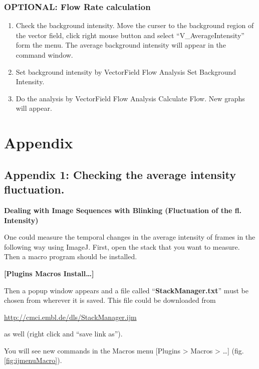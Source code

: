 \documentclass{article}
\begin{document}
\subsubsection{OPTIONAL: Flow Rate calculation}
\begin{enumerate}
\item
  Check the background intensity. Move the curser to the background
  region of the vector field, click right mouse button and select
  ``V\_AverageIntensity'' form the menu. The average background
  intensity will appear in the command window.
\item
  Set background intensity by VectorField Flow Analysis Set Background
  Intensity.
\item
  Do the analysis by VectorField Flow Analysis Calculate Flow. New
  graphs will appear.
\end{enumerate}

\section{Appendix}
\label{appendix}

\label{subsec:app1}
\subsection{Appendix 1: Checking the average intensity fluctuation.}

\textbf{Dealing with Image Sequences with Blinking (Fluctuation of the
fl. Intensity)}

One could measure the temporal changes in the average intensity of
frames in the following way using ImageJ. First, open the stack that you want to measure. Then a macro program should be installed.

\textbf{{[}Plugins Macros Install\ldots{}{]}}

Then a popup window appears and a file called
``\textbf{StackManager.txt}'' must be chosen from wherever it is saved.
This file could be downloaded from

\url{http://cmci.embl.de/dls/StackManager.ijm}

as well (right click and ``save link as'').

You will see new commands in the Macros menu {[}Plugins \textgreater{}
Macros \textgreater{} \ldots{}{]} (fig. \ref{fig:ijmenuMacro}).
\end{document}
